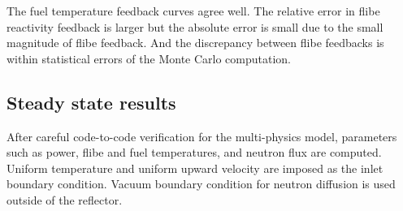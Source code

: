 \documentclass{elsarticle}
\begin{document}
The fuel temperature feedback curves agree well. 
The relative error in flibe reactivity feedback is larger but the absolute error is small due to the small magnitude of flibe feedback. And the discrepancy between flibe feedbacks is within statistical errors of the Monte Carlo computation. 


\subsection{Steady state results}
After careful code-to-code verification for the multi-physics model, parameters such as power, flibe and fuel temperatures, and neutron flux are computed. Uniform temperature and uniform upward velocity are imposed as the inlet boundary condition. Vacuum boundary condition for neutron diffusion is used outside of the reflector.  
\end{document}
